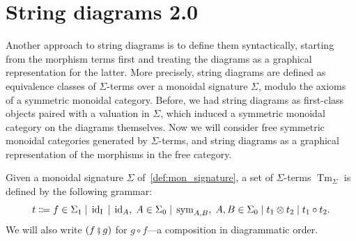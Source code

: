 \section{String diagrams 2.0}
\label{sec:string-diagrams-Bonchi}

Another approach to string diagrams is to define them syntactically, starting from the morphism terms first and treating the diagrams as a graphical representation for the latter.
More precisely, string diagrams are defined as equivalence classes of $\Sigma$-terms over a monoidal signature $\Sigma$, modulo the axioms of a symmetric monoidal category.
Before, we had string diagrams as first-class objects paired with a valuation in $\Sigma$, which induced a symmetric monoidal category on the diagrams themselves.
Now we will consider free symmetric monoidal categories generated by $\Sigma$-terms, and string diagrams as a graphical representation of the morphisms in the free category.
\begin{definition}
  \label{def:sigma-terms}
  Given a monoidal signature $\Sigma$ of~\cref{def:mon_signature}, a set of $\Sigma$-terms $\operatorname{Tm}_{\Sigma}$ is defined by the following grammar:
  \[
  t \Coloneqq f \in \Sigma_1 \;\vert\; \operatorname{id}_{\operatorname{I}} \;\vert\; \operatorname{id}_A,\; A \in \Sigma_0 \;\vert\; \operatorname{sym}_{A,B},\; A,B \in \Sigma_0 \;\vert\; t_1 \otimes t_2 \;\vert\; t_1 \circ t_2.
  \] 
  We will also write $(f \fatsemi g)$ for $g \circ f$---a composition in diagrammatic order.
\end{definition}

